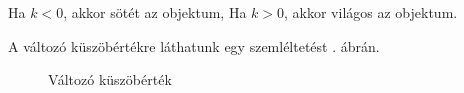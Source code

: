 Ha $k < 0$, akkor sötét az objektum,
Ha $k > 0$, akkor világos az objektum.

A változó küszöbértékre láthatunk egy szemléltetést . ábrán.

\begin{figure}[ht]
\centering
{}
\caption{Változó küszöbérték} 
\label{fig:niblack}
\end{figure}

